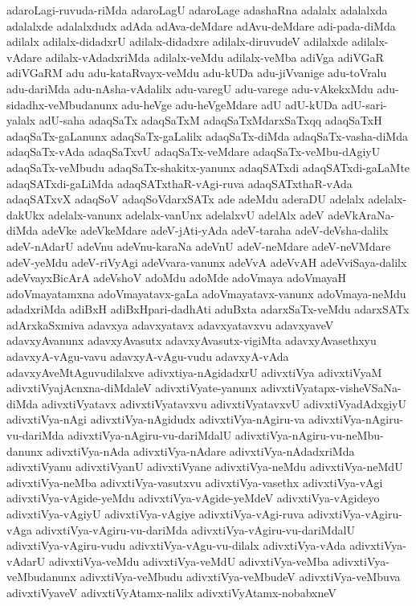 {adaroLagi-ruvuda-riMda
adaroLagU
adaroLage
adashaRna
adalalx
adalalxda
adalalxde
adalalxdudx
adAda
adAva-deMdare
adAvu-deMdare
adi-pada-diMda
adilalx
adilalx-didadxrU
adilalx-didadxre
adilalx-diruvudeV
adilalxde
adilalx-vAdare
adilalx-vAdadxriMda
adilalx-veMdu
adilalx-veMba
adiVga
adiVGaR
adiVGaRM
adu
adu-kataRvayx-veMdu
adu-kUDa
adu-jiVvanige
adu-toVralu
adu-dariMda
adu-nAsha-vAdalilx
adu-varegU
adu-varege
adu-vAkekxMdu
adu-sidadhx-veMbudanunx
adu-heVge
adu-heVgeMdare
adU
adU-kUDa
adU-sari-yalalx
adU-saha
adaqSaTx
adaqSaTxM
adaqSaTxMdarxSaTxqq
adaqSaTxH
adaqSaTx-gaLanunx
adaqSaTx-gaLalilx
adaqSaTx-diMda
adaqSaTx-vasha-diMda
adaqSaTx-vAda
adaqSaTxvU
adaqSaTx-veMdare
adaqSaTx-veMbu-dAgiyU
adaqSaTx-veMbudu
adaqSaTx-shakitx-yanunx
adaqSATxdi
adaqSATxdi-gaLaMte
adaqSATxdi-gaLiMda
adaqSATxthaR-vAgi-ruva
adaqSATxthaR-vAda
adaqSATxvX
adaqSoV
adaqSoVdarxSATx
ade
adeMdu
aderaDU
adelalx
adelalx-dakUkx
adelalx-vanunx
adelalx-vanUnx
adelalxvU
adelAlx
adeV
adeVkAraNa-diMda
adeVke
adeVkeMdare
adeV-jAti-yAda
adeV-taraha
adeV-deVsha-dalilx
adeV-nAdarU
adeVnu
adeVnu-karaNa
adeVnU
adeV-neMdare
adeV-neVMdare
adeV-yeMdu
adeV-riVyAgi
adeVvara-vanunx
adeVvA
adeVvAH
adeVviSaya-dalilx
adeVvayxBicArA
adeVshoV
adoMdu
adoMde
adoVmaya
adoVmayaH
adoVmayatamxna
adoVmayatavx-gaLa
adoVmayatavx-vanunx
adoVmaya-neMdu
adadxriMda
adiBxH
adiBxHpari-dadhAti
aduBxta
adarxSaTx-veMdu
adarxSATx
adArxkaSxmiva
adavxya
adavxyatavx
adavxyatavxvu
adavxyaveV
adavxyAvanunx
adavxyAvasutx
adavxyAvasutx-vigiMta
adavxyAvasethxyu
adavxyA-vAgu-vavu
adavxyA-vAgu-vudu
adavxyA-vAda
adavxyAveMtAguvudilalxve
adivxtiya-nAgidadxrU
adivxtiVya
adivxtiVyaM
adivxtiVyajAcnxna-diMdaleV
adivxtiVyate-yanunx
adivxtiVyatapx-visheVSaNa-diMda
adivxtiVyatavx
adivxtiVyatavxvu
adivxtiVyatavxvU
adivxtiVyadAdxgiyU
adivxtiVya-nAgi
adivxtiVya-nAgidudx
adivxtiVya-nAgiru-va
adivxtiVya-nAgiru-vu-dariMda
adivxtiVya-nAgiru-vu-dariMdalU
adivxtiVya-nAgiru-vu-neMbu-danunx
adivxtiVya-nAda
adivxtiVya-nAdare
adivxtiVya-nAdadxriMda
adivxtiVyanu
adivxtiVyanU
adivxtiVyane
adivxtiVya-neMdu
adivxtiVya-neMdU
adivxtiVya-neMba
adivxtiVya-vasutxvu
adivxtiVya-vasethx
adivxtiVya-vAgi
adivxtiVya-vAgide-yeMdu
adivxtiVya-vAgide-yeMdeV
adivxtiVya-vAgideyo
adivxtiVya-vAgiyU
adivxtiVya-vAgiye
adivxtiVya-vAgi-ruva
adivxtiVya-vAgiru-vAga
adivxtiVya-vAgiru-vu-dariMda
adivxtiVya-vAgiru-vu-dariMdalU
adivxtiVya-vAgiru-vudu
adivxtiVya-vAgu-vu-dilalx
adivxtiVya-vAda
adivxtiVya-vAdarU
adivxtiVya-veMdu
adivxtiVya-veMdU
adivxtiVya-veMba
adivxtiVya-veMbudanunx
adivxtiVya-veMbudu
adivxtiVya-veMbudeV
adivxtiVya-veMbuva
adivxtiVyaveV
adivxtiVyAtamx-nalilx
adivxtiVyAtamx-nobabxneV
}
